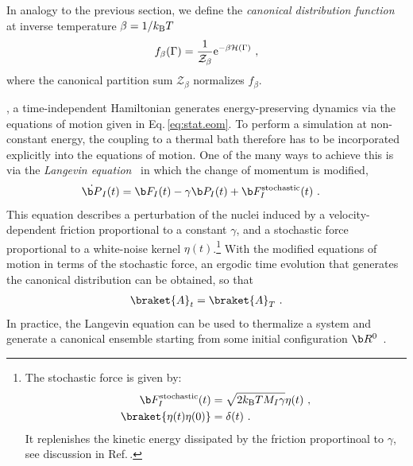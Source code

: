 In analogy to the previous section, we 
define the \emph{canonical distribution function} at inverse temperature $\beta = 1 / k_{\rm B} T$
\begin{align}
	f_\beta (\Gamma) 
		= \frac{1}{\mathcal{Z}_\beta} {\rm e}^{- \beta \mathcal H (\Gamma)}~,
	\label{eq:f.canonical}
\end{align}
where the  canonical partition sum $\mathcal{Z}_\beta$ normalizes $f_\beta$. 

, a time-independent Hamiltonian generates energy-preserving dynamics via the equations of motion given in Eq.\,\eqref{eq:stat.eom}. To perform a simulation at non-constant energy, the coupling to a thermal bath therefore has to be incorporated explicitly into the equations of motion. One of the many ways to achieve this is via the \emph{Langevin equation}~\cite{Vanden2006} in which the change of momentum is modified,
\begin{align}
	\dot{\b P}_I (t) 
		&= \b F_I (t) - \gamma \b P_I (t) + \b F^{\rm stochastic}_I (t)~.
	\label{eq:stat.Langevin}
\end{align}
This equation describes a perturbation of the nuclei induced by a velocity-dependent friction proportional to a constant $\gamma$, %
and a stochastic force proportional to a white-noise kernel $\eta (t)$.\footnote{
	The stochastic force is given by:
	\begin{align*}
	\b F^{\rm stochastic}_I (t) 
	&= \sqrt{2 k_{\rm B} T M_I \gamma} \eta (t)~, \\
	\braket{\eta (t) \eta (0)}
	& = \delta (t)~.
	\end{align*}
	It replenishes the kinetic energy dissipated by the friction proportinoal to $\gamma$, see discussion in Ref.\,\cite[p.\,328]{Phillies2012}.
}
With the modified equations of motion in terms of the stochastic force, an ergodic time evolution that generates the canonical distribution can be obtained, so that
\begin{align}
  \braket{A}_t = \braket{A}_{T}~.
\end{align}
In practice, the Langevin equation can be used to thermalize a system and generate a canonical ensemble starting from some initial configuration $\b R^0$~\cite[p.\,590]{Tuckerman}.

